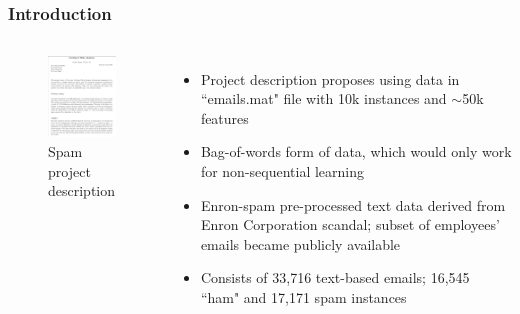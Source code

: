 \documentclass{beamer}
\begin{document}
	\subsection{}
	\begin{framefont}{\footnotesize}
		\begin{frame}
			\frametitle{Introduction}
			\vspace{-10pt}
			\begin{columns}
				\centering
				\begin{figure}
					\captionsetup{justification=centering}
					\includegraphics[trim={0.5cm 0cm 0.5cm 0.2cm},clip,width=4.7cm]{project_description.png}
					\caption{Spam project description}
				\end{figure}
				\begin{itemize}
					\setlength\itemsep{1.5em}
					\item Project description proposes using data in ``emails.mat" file with 10k instances and $\sim$50k features
					\item Bag-of-words form of data, which would only work for non-sequential learning
					\item Enron-spam pre-processed text data derived from Enron Corporation scandal; subset of employees' emails became publicly available \parencite{metsis2006spam}
					\item Consists of 33,716 text-based emails; 16,545 ``ham" and 17,171 spam instances
				\end{itemize}
			\end{columns}
		\end{frame}
	\end{framefont}
	
\end{document}

